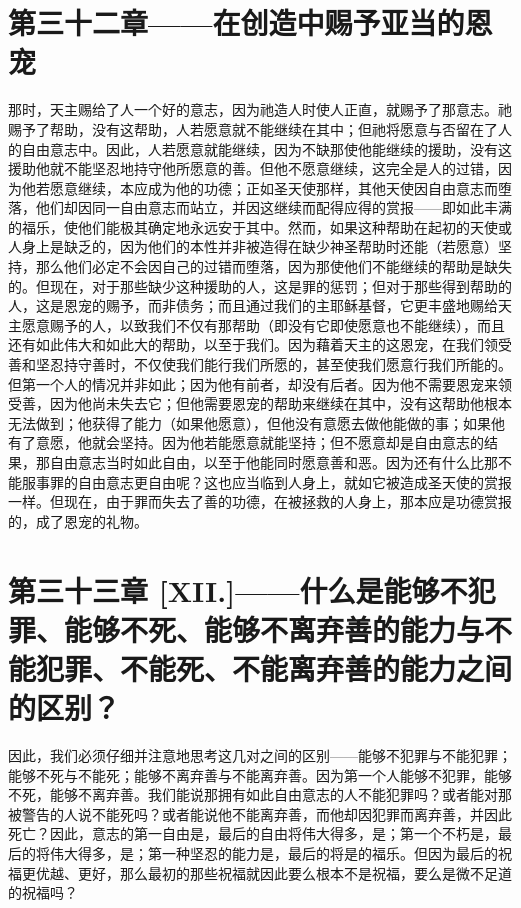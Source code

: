 
\section{第三十二章——在创造中赐予亚当的恩宠}

那时，天主赐给了人一个好的意志，因为祂造人时使人正直，就赐予了那意志。祂赐予了帮助，没有这帮助，人若愿意就不能继续在其中；但祂将愿意与否留在了人的自由意志中。因此，人若愿意就能继续，因为不缺那使他能继续的援助，没有这援助他就不能坚忍地持守他所愿意的善。但他不愿意继续，这完全是人的过错，因为他若愿意继续，本应成为他的功德；正如圣天使那样，其他天使因自由意志而堕落，他们却因同一自由意志而站立，并因这继续而配得应得的赏报——即如此丰满的福乐，使他们能极其确定地永远安于其中。然而，如果这种帮助在起初的天使或人身上是缺乏的，因为他们的本性并非被造得在缺少神圣帮助时还能（若愿意）坚持，那么他们必定不会因自己的过错而堕落，因为那使他们不能继续的帮助是缺失的。但现在，对于那些缺少这种援助的人，这是罪的惩罚；但对于那些得到帮助的人，这是恩宠的赐予，而非债务；而且通过我们的主耶稣基督，它更丰盛地赐给天主愿意赐予的人，以致我们不仅有那帮助（即没有它即使愿意也不能继续），而且还有如此伟大和如此大的帮助，以至于我们。因为藉着天主的这恩宠，在我们领受善和坚忍持守善时，不仅使我们能行我们所愿的，甚至使我们愿意行我们所能的。但第一个人的情况并非如此；因为他有前者，却没有后者。因为他不需要恩宠来领受善，因为他尚未失去它；但他需要恩宠的帮助来继续在其中，没有这帮助他根本无法做到；他获得了能力（如果他愿意），但他没有意愿去做他能做的事；如果他有了意愿，他就会坚持。因为他若能愿意就能坚持；但不愿意却是自由意志的结果，那自由意志当时如此自由，以至于他能同时愿意善和恶。因为还有什么比那不能服事罪的自由意志更自由呢？这也应当临到人身上，就如它被造成圣天使的赏报一样。但现在，由于罪而失去了善的功德，在被拯救的人身上，那本应是功德赏报的，成了恩宠的礼物。\par


\section{第三十三章 [XII.]——什么是能够不犯罪、能够不死、能够不离弃善的能力与不能犯罪、不能死、不能离弃善的能力之间的区别？}

因此，我们必须仔细并注意地思考这几对之间的区别——能够不犯罪与不能犯罪；能够不死与不能死；能够不离弃善与不能离弃善。因为第一个人能够不犯罪，能够不死，能够不离弃善。我们能说那拥有如此自由意志的人不能犯罪吗？或者能对那被警告的人说不能死吗？或者能说他不能离弃善，而他却因犯罪而离弃善，并因此死亡？因此，意志的第一自由是，最后的自由将伟大得多，是；第一个不朽是，最后的将伟大得多，是；第一种坚忍的能力是，最后的将是的福乐。但因为最后的祝福更优越、更好，那么最初的那些祝福就因此要么根本不是祝福，要么是微不足道的祝福吗？\par

